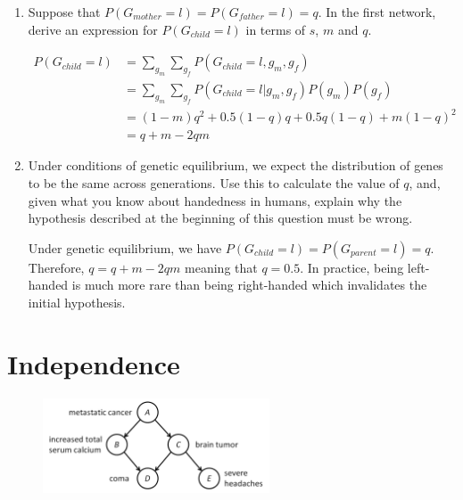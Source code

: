 \documentclass[11pt, a4paper]{article}
\begin{document}
\begin{enumerate}
    \item Suppose that $P(G_{mother} = l) = P(G_{father} = l) = q$. In the first network, derive an expression for $P(G_{child} = l)$ in terms of $s$, $m$ and $q$.
    \begin{solution}
        \begin{align*}
            P(G_{child} = l) & = \sum_{g_m} \sum_{g_f} P(G_{child} = l, g_m, g_f) \\
            & = \sum_{g_m} \sum_{g_f} P(G_{child} = l | g_m, g_f) P(g_m) P(g_f) \\
            & = (1 - m) q^2 + 0.5 (1 - q) q + 0.5 q (1 - q) + m (1 - q)^2 \\
            & = q + m - 2qm
        \end{align*}
    \end{solution}

    \item Under conditions of genetic equilibrium, we expect the distribution of genes to be the same across generations. Use this to calculate the value of $q$, and, given what you know about handedness in humans, explain why the hypothesis described at the beginning of this question must be wrong.

    \begin{solution}
        Under genetic equilibrium, we have $P(G_{child} = l) = P(G_{parent} = l) = q$. Therefore, $q = q + m - 2 q m$ meaning that $q = 0.5$. In practice, being left-handed is much more rare than being right-handed which invalidates the initial hypothesis.
    \end{solution}
\end{enumerate}

\newpage

\section{Independence}

\begin{figure}[h]
    \centering
    \includegraphics[width=0.6\textwidth]{figures/e3_independence.png}
\end{figure}
\end{document}
